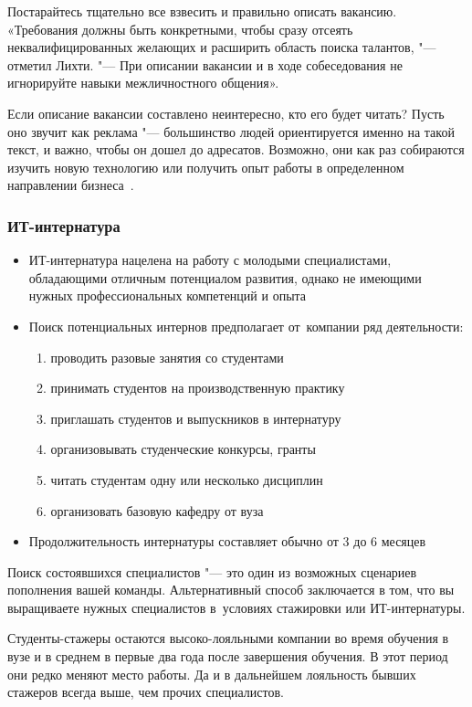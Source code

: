 \documentclass{../industrial-development}
\begin{document}
Постарайтесь тщательно все взвесить и правильно описать вакансию. «Требования должны быть конкретными, чтобы сразу отсеять неквалифицированных желающих и рас­ширить область поиска талантов, "--- отметил Лихти. "--- При описании вакансии и в ходе собеседования не игнорируйте навыки межличностного общения».

Если описание вакансии составлено неинтересно, кто его будет читать? Пусть оно звучит как реклама "--- большинство людей ориентируется именно на такой текст, и важно, чтобы он дошел до адресатов. Возможно, они как раз собираются изучить новую технологию или получить опыт работы в определенном направлении бизнеса~\cite{RichHein}.


\begin{frame} \frametitle{ИТ-интернатура}
  \begin{itemize}
		\item ИТ-интернатура нацелена на работу с молодыми специалистами, обладающими отличным потенциалом развития, однако не имеющими нужных профессиональных компетенций и опыта
		\item Поиск потенциальных интернов предполагает от~компании ряд деятельности:
  \begin{enumerate}
\item проводить разовые занятия со студентами
\item	принимать студентов на производственную практику
\item	приглашать студентов и выпускников в интернатуру
\item	организовывать студенческие конкурсы, гранты
\item	читать студентам одну или несколько дисциплин
\item	организовать базовую кафедру от вуза
	  \end{enumerate}
	\item Продолжительность интернатуры составляет обычно от 3 до 6 месяцев
  \end{itemize}
\end{frame}

\lecturenotes

Поиск состоявшихся специалистов "--- это один из возможных сценариев пополнения вашей команды. Альтернативный способ заключается в том, что вы выращиваете нужных специалистов в~условиях стажировки или ИТ-интернатуры.

Студенты-стажеры остаются высоко-лояльными компании во время обучения в вузе и в среднем в первые два года после завершения обучения. В этот период они редко меняют место работы. Да и в дальнейшем лояльность бывших стажеров всегда выше, чем прочих специалистов.
\end{document}
